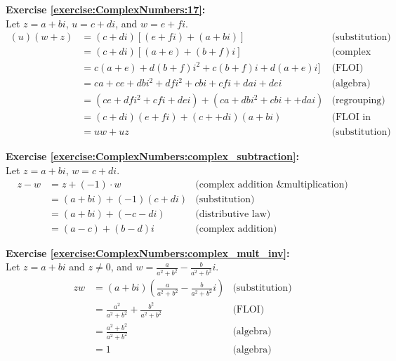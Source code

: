 \noindent\textbf{Exercise \ref{exercise:ComplexNumbers:17}:}
\\
Let $z = a + bi$, $u = c + di$, and $w = e + fi$.
\begin{align*}
(u)(w + z) &= (c + di)[(e + fi) + (a + bi)] &\text{(substitution)}\\
&= (c + di)[(a + e) + (b + f)i] &\text{(complex addition)}\\
&= c(a + e) + d(b + f)i^{2} + c(b + f)i + d(a + e)i ] &\text{(FLOI)}\\
&= ca + ce + dbi^{2} + dfi^{2} + cbi + cfi + dai + dei    &\text{(algebra)}\\
&= (ce + dfi^{2} + cfi +dei) + (ca + dbi^{2} + cbi + +dai)  &\text{(regrouping)}\\
&= (c + di)(e + fi) + (c + + di)(a + bi)  &\text{(FLOI in reverse)}\\
&= uw + uz &\text{(substitution)}
\end{align*}

\noindent\textbf{Exercise \ref{exercise:ComplexNumbers:complex_subtraction}:}
\\
Let $z = a + bi$, $w = c + di$.
\begin{align*}
z - w &= z + (-1)\cdot w &\text{(complex addition \& multiplication)}\\
&= (a + bi) + (-1)(c + di) &\text{(substitution)}\\
&= (a + bi) + (-c - di) &\text{(distributive law)}\\
&= (a - c) + (b - d)i &\text{(complex addition)}
\end{align*}

\noindent\textbf{Exercise \ref{exercise:ComplexNumbers:complex_mult_inv}:}%
\\
Let $z = a + bi$ and $z \neq 0$, and $w=\frac{a}{a^{2}+b^{2}}- \frac{b}{a^{2}+b^{2}}i$.
\begin{align*}
zw &= (a + bi)\left(\frac{a}{a^{2}+b^{2}}- \frac{b}{a^{2}+b^{2}}i\right) &\text{(substitution)}\\
&= \frac{a^{2}}{a^{2}+b^{2}} + \frac{b^{2}}{a^{2}+b^{2}} &\text{(FLOI)}\\
&= \frac{a^{2} + b^{2}}{a^{2}+b^{2}} &\text{(algebra)}\\
&= 1 &\text{(algebra)}
\end{align*}

